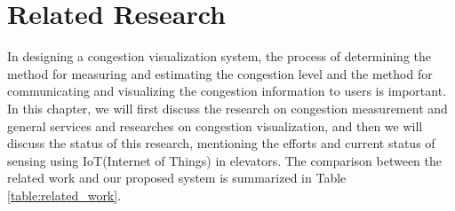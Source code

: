 \section{Related Research}

In designing a congestion visualization system, the process of determining the method for measuring and estimating the congestion level and the method for communicating and visualizing the congestion information to users is important. In this chapter, we will first discuss the research on congestion measurement and general services and researches on congestion visualization, and then we will discuss the status of this research, mentioning the efforts and current status of sensing using IoT(Internet of Things) in elevators. The comparison between the related work and our proposed system is summarized in Table \ref{table:related_work}.


